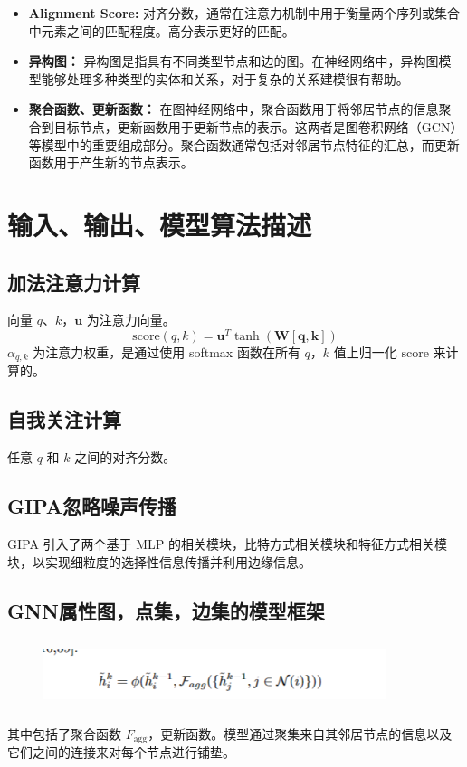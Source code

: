 \documentclass{article}
\begin{document}
\begin{itemize}
\item \textbf{Alignment Score:} 对齐分数，通常在注意力机制中用于衡量两个序列或集合中元素之间的匹配程度。高分表示更好的匹配。

\item \textbf{异构图：} 异构图是指具有不同类型节点和边的图。在神经网络中，异构图模型能够处理多种类型的实体和关系，对于复杂的关系建模很有帮助。

\item \textbf{聚合函数、更新函数：} 在图神经网络中，聚合函数用于将邻居节点的信息聚合到目标节点，更新函数用于更新节点的表示。这两者是图卷积网络（GCN）等模型中的重要组成部分。聚合函数通常包括对邻居节点特征的汇总，而更新函数用于产生新的节点表示。

\end{itemize}
\section*{输入、输出、模型算法描述}

\subsection*{加法注意力计算}
向量 \(q\)、\(k\)，\(\mathbf{u}\) 为注意力向量。
\[ \text{score}(q, k) = \mathbf{u}^T \tanh(\mathbf{W}[\mathbf{q}, \mathbf{k}]) \]
\(\alpha_{q,k}\) 为注意力权重，是通过使用 softmax 函数在所有 \(q\)，\(k\) 值上归一化 \(\text{score}\) 来计算的。

\subsection*{自我关注计算}
任意 \(q\) 和 \(k\) 之间的对齐分数。

\subsection*{GIPA忽略噪声传播}
GIPA 引入了两个基于 MLP 的相关模块，比特方式相关模块和特征方式相关模块，以实现细粒度的选择性信息传播并利用边缘信息。

\subsection*{GNN属性图，点集，边集的模型框架}
\begin{figure}[htbp]
    \centering
    \includegraphics[width=10cm, height=2cm]{模型.png}
\end{figure}
其中包括了聚合函数 \(F_{\text{agg}}\)，更新函数。模型通过聚集来自其邻居节点的信息以及它们之间的连接来对每个节点进行铺垫。
\end{document}
